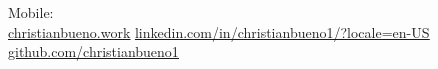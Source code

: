 \begin{center}
  \name{\candidateName} \\[2pt]
  \small\textbf{\candidateTitle} \\[3pt]
  \small
  \candidateLocation \separator{}
  Mobile: \candidatePhone \separator{}
  \href{mailto:\candidateEmail}{\uline{\candidateEmail}} \\
  \href{\candidateWebsiteUrl}{\uline{christianbueno.work}} \separator{}
  \href{\candidateLinkedInUrl}{\uline{linkedin.com/in/christianbueno1/?locale=en-US}} \separator{}
  \href{\candidateGitHubUrl}{\uline{github.com/christianbueno1}}
\end{center}
